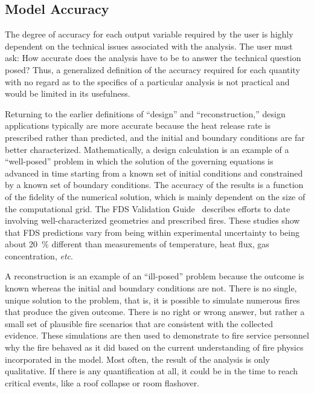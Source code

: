 \subsection{Model Accuracy}

The degree of  accuracy for each output variable  required by the user
is  highly  dependent on  the  technical  issues  associated with  the
analysis.  The user  must ask: How accurate does  the analysis have to
be  to  answer  the  technical  question posed?  Thus,  a  generalized
definition of the  accuracy required for each quantity  with no regard
as  to the specifics  of a  particular analysis  is not  practical and
would be limited in its usefulness.

Returning   to    the   earlier   definitions    of   ``design''   and
``reconstruction,''  design applications  typically are  more accurate
because the heat release rate is prescribed rather than predicted, and
the    initial    and    boundary    conditions   are    far    better
characterized. Mathematically, a design calculation is an example of a
``well-posed''  problem  in  which   the  solution  of  the  governing
equations is  advanced in  time starting from  a known set  of initial
conditions and constrained by a known set of boundary conditions.  The
accuracy of the results is a function of the fidelity of the numerical
solution, which is  mainly dependent on the size  of the computational
grid. The FDS Validation Guide~\cite{FDS_Validation_Guide_5} describes
efforts to date involving well-characterized geometries and prescribed
fires. These studies show that  FDS predictions vary from being within
experimental   uncertainty  to  being   about  20~\%   different  than
measurements of temperature, heat flux, gas concentration, {\em etc}.

A reconstruction is an example of an ``ill-posed'' problem because the
outcome  is known  whereas  the initial  and  boundary conditions  are
not. There is  no single, unique solution to the  problem, that is, it
is possible to simulate numerous fires that produce the given outcome.
There is no right or wrong answer, but rather a small set of plausible
fire scenarios that are  consistent with the collected evidence. These
simulations are then used to demonstrate to fire service personnel why
the fire behaved as it did  based on the current understanding of fire
physics  incorporated in  the model.  Most  often, the  result of  the
analysis is only  qualitative. If there is any  quantification at all,
it could be in the time to reach critical events, like a roof collapse
or room flashover.
